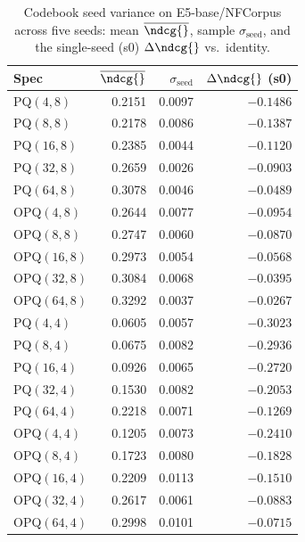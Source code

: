 \begin{table}[t]
\centering
\small
\caption{Codebook seed variance on E5-base/NFCorpus across five seeds: mean $\overline{\ndcg{}}$, sample $\sigma_{\text{seed}}$, and the single-seed (s0) $\Delta\ndcg{}$ vs.\ identity.}
\label{tab:seed-variance-e5-base-nfcorpus}
\begin{tabular}{lrrr}
\toprule
Spec & $\overline{\ndcg{}}$ & $\sigma_{\text{seed}}$ & $\Delta\ndcg{}$ (s0) \\
\midrule
PQ$(4,8)$ & 0.2151 & 0.0097 & $-0.1486$ \\
PQ$(8,8)$ & 0.2178 & 0.0086 & $-0.1387$ \\
PQ$(16,8)$ & 0.2385 & 0.0044 & $-0.1120$ \\
PQ$(32,8)$ & 0.2659 & 0.0026 & $-0.0903$ \\
PQ$(64,8)$ & 0.3078 & 0.0046 & $-0.0489$ \\
OPQ$(4,8)$ & 0.2644 & 0.0077 & $-0.0954$ \\
OPQ$(8,8)$ & 0.2747 & 0.0060 & $-0.0870$ \\
OPQ$(16,8)$ & 0.2973 & 0.0054 & $-0.0568$ \\
OPQ$(32,8)$ & 0.3084 & 0.0068 & $-0.0395$ \\
OPQ$(64,8)$ & 0.3292 & 0.0037 & $-0.0267$ \\
PQ$(4,4)$ & 0.0605 & 0.0057 & $-0.3023$ \\
PQ$(8,4)$ & 0.0675 & 0.0082 & $-0.2936$ \\
PQ$(16,4)$ & 0.0926 & 0.0065 & $-0.2720$ \\
PQ$(32,4)$ & 0.1530 & 0.0082 & $-0.2053$ \\
PQ$(64,4)$ & 0.2218 & 0.0071 & $-0.1269$ \\
OPQ$(4,4)$ & 0.1205 & 0.0073 & $-0.2410$ \\
OPQ$(8,4)$ & 0.1723 & 0.0080 & $-0.1828$ \\
OPQ$(16,4)$ & 0.2209 & 0.0113 & $-0.1510$ \\
OPQ$(32,4)$ & 0.2617 & 0.0061 & $-0.0883$ \\
OPQ$(64,4)$ & 0.2998 & 0.0101 & $-0.0715$ \\
\bottomrule
\end{tabular}
\end{table}

